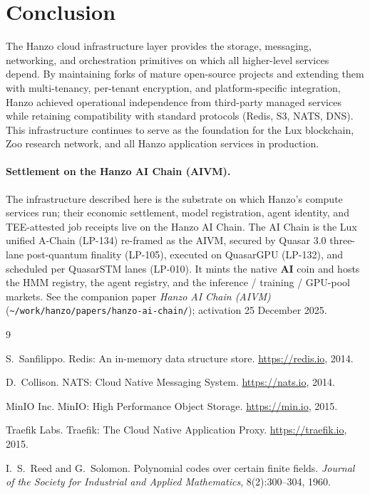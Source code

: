 \documentclass[11pt,a4paper]{article}
\begin{document}
\section{Conclusion}

The Hanzo cloud infrastructure layer provides the storage, messaging, networking, and orchestration primitives on which all higher-level services depend. By maintaining forks of mature open-source projects and extending them with multi-tenancy, per-tenant encryption, and platform-specific integration, Hanzo achieved operational independence from third-party managed services while retaining compatibility with standard protocols (Redis, S3, NATS, DNS). This infrastructure continues to serve as the foundation for the Lux blockchain, Zoo research network, and all Hanzo application services in production.

\paragraph{Settlement on the Hanzo AI Chain (AIVM).}
The infrastructure described here is the substrate on which Hanzo's compute services run; their economic settlement, model registration, agent identity, and TEE-attested job receipts live on the Hanzo AI Chain. The AI Chain is the Lux unified A-Chain (LP-134) re-framed as the AIVM, secured by Quasar 3.0 three-lane post-quantum finality (LP-105), executed on QuasarGPU (LP-132), and scheduled per QuasarSTM lanes (LP-010). It mints the native \textbf{AI} coin and hosts the HMM registry, the agent registry, and the inference / training / GPU-pool markets. See the companion paper \emph{Hanzo AI Chain (AIVM)} (\texttt{\textasciitilde/work/hanzo/papers/hanzo-ai-chain/}); activation 25 December 2025.


\begin{thebibliography}{9}

S.~Sanfilippo. Redis: An in-memory data structure store. \url{https://redis.io}, 2014.

D.~Collison. NATS: Cloud Native Messaging System. \url{https://nats.io}, 2014.

MinIO Inc. MinIO: High Performance Object Storage. \url{https://min.io}, 2015.

Traefik Labs. Traefik: The Cloud Native Application Proxy. \url{https://traefik.io}, 2015.

I.~S.~Reed and G.~Solomon. Polynomial codes over certain finite fields. \textit{Journal of the Society for Industrial and Applied Mathematics}, 8(2):300--304, 1960.

\end{thebibliography}
\end{document}
